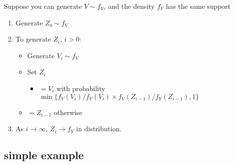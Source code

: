 Suppose you can generate $V ∼ f_V$, and the density $f_Y$ has the same
support
\begin{enumerate}
\item Generate $Z₀ ∼ f_V$
\item To generate $Z_i$, $i > 0$:
\begin{itemize}
\item Generate $V_i ∼ f_V$
\item Set $Z_i$
\begin{itemize}
\item $= V_i$ with probability $\min\{ f_Y(V_i)/ f_V(V_i)
  × f_V(Z_{i-1}) / f_Y(Z_{i-1}), 1\}$
\end{itemize}
\item $= Z_{i-1}$ otherwise
\end{itemize}
\item As $i → ∞$, $Z_i → f_Y$ in distribution.
\end{enumerate}

\subsection{simple example}

